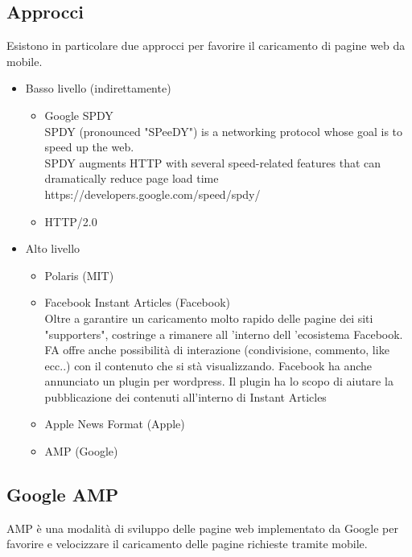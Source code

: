 \documentclass[a4paper]{article}
\begin{document}
\subsection{Approcci}
Esistono in particolare due approcci per favorire il caricamento di pagine web da mobile.
\begin{itemize}
    \item Basso livello (indirettamente)
    \begin{itemize}
        \item Google SPDY\\ 
        SPDY (pronounced "SPeeDY") is a networking protocol whose goal is to speed up the web.\\
        SPDY augments HTTP with several speed-related features that can dramatically reduce page load time\\
        https://developers.google.com/speed/spdy/
        \item HTTP/2.0
    \end{itemize}

    \item Alto livello
    \begin{itemize}
        \item Polaris (MIT)
        \item Facebook Instant Articles (Facebook)\\
        Oltre a garantire un caricamento molto rapido delle pagine dei siti "supporters", costringe a rimanere all ’interno dell ’ecosistema Facebook.
FA offre anche possibilità di interazione (condivisione, commento, like ecc..) con il contenuto che si stà visualizzando.
Facebook ha anche annunciato un plugin per wordpress. Il plugin ha lo scopo di aiutare la pubblicazione dei contenuti all’interno di Instant Articles

        \item Apple News Format (Apple)
        \item AMP (Google)
    \end{itemize}
\end{itemize}

\newpage
\subsection{Google AMP}
AMP è una modalità di sviluppo delle pagine web implementato da Google per favorire e velocizzare il caricamento delle pagine richieste tramite mobile.
\end{document}
